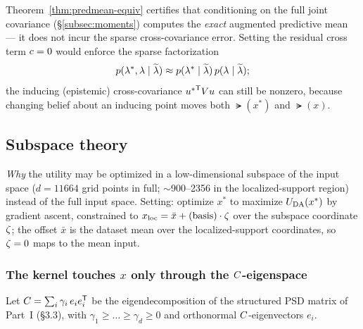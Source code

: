 \begin{remark}
Theorem~\ref{thm:predmean-equiv} certifies that conditioning on the full joint
covariance (\S\ref{subsec:moments}) computes the \emph{exact} augmented
predictive mean --- it does not incur the sparse cross-covariance error.
Setting the residual cross term $c=0$ would enforce the sparse factorization
\[
  p(\lambda^*,\lambda\mid\widetilde{\lambda})\approx p(\lambda^*\mid\widetilde{\lambda})\,p(\lambda\mid\widetilde{\lambda});
\]
the inducing (epistemic) cross-covariance ${u^*}^{\mathsf{T}}Vu$ can still be
nonzero, because changing belief about an inducing point moves both $\lat(x^*)$
and $\lat(x)$.
\end{remark}

\subsection{Subspace theory}
\label{subsec:subspace}

\emph{Why} the utility may be optimized in a low-dimensional subspace of the
input space ($d=11664$ grid points in full; $\sim$900--2356 in the
localized-support region) instead of the full input space. Setting: optimize
$x^*$ to maximize $U_{\mathrm{DA}}(x^*)$ by gradient ascent, constrained to
$x_{\mathrm{loc}}=\bar{x}+\text{(basis)}\cdot\zeta$ over the subspace coordinate
$\zeta$; the offset $\bar{x}$ is the dataset mean over the localized-support
coordinates, so $\zeta=0$ maps to the mean input.

\subsubsection{The kernel touches $x$ only through the $C$-eigenspace}
Let $C=\sum_i\gamma_i\,e_i e_i^{\mathsf{T}}$ be the eigendecomposition of the
structured PSD matrix of Part~I (\S3.3), with $\gamma_1\ge\dots\ge\gamma_d\ge0$
and orthonormal $C$-eigenvectors $e_i$.

